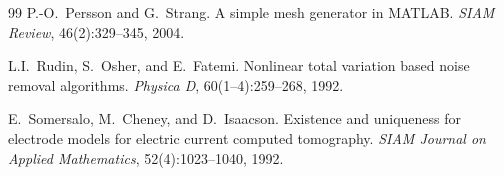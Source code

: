 \documentclass[11pt,a4paper]{article}
\begin{document}
\begin{thebibliography}{99}
P.-O.~Persson and G.~Strang.
\newblock A simple mesh generator in MATLAB.
\newblock \emph{SIAM Review}, 46(2):329--345, 2004.

L.I.~Rudin, S.~Osher, and E.~Fatemi.
\newblock Nonlinear total variation based noise removal algorithms.
\newblock \emph{Physica D}, 60(1--4):259--268, 1992.

E.~Somersalo, M.~Cheney, and D.~Isaacson.
\newblock Existence and uniqueness for electrode models for electric current
  computed tomography.
\newblock \emph{SIAM Journal on Applied Mathematics}, 52(4):1023--1040, 1992.

\end{thebibliography}
\end{document}
